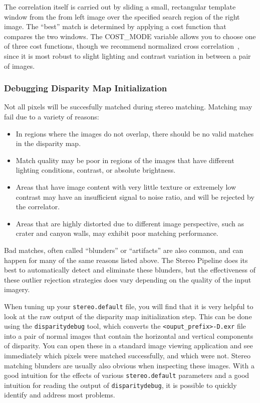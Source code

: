 The correlation itself is carried out by sliding a small, rectangular
template window from the from left image over the specified search
region of the right image.  The ``best'' match is determined by
applying a cost function that compares the two windows.  The
COST\_MODE variable allows you to choose one of three cost functions,
though we recommend normalized cross
correlation~\cite{Menard97:robust}, since it is most robust to slight
lighting and contrast variation in between a pair of images.

\subsubsection{Debugging Disparity Map Initialization}

Not all pixels will be succesfully matched during stereo matching.
Matching may fail due to a variety of reasons:

\begin{itemize}
\item In regions where the images do not overlap, there should be no
  valid matches in the disparity map.
\item Match quality may be poor in regions of the images that have
  different lighting conditions, contrast, or absolute brightness.  
\item Areas that have image content with very little texture or
  extremely low contrast may have an insufficient signal to noise
  ratio, and will be rejected by the correlator.
\item Areas that are highly distorted due to different image
  perspective, such as crater and canyon walls, may exhibit poor
  matching performance.
\end{itemize}

Bad matches, often called ``blunders'' or ``artifacts'' are also
common, and can happen for many of the same reasons listed above.  The
Stereo Pipeline does its best to automatically detect and eliminate
these blunders, but the effectiveness of these outlier rejection
strategies does vary depending on the quality of the input imagery.

When tuning up your {\tt stereo.default} file, you will find that it
is very helpful to look at the raw output of the disparity map
initialization step.  This can be done using the {\tt disparitydebug}
tool, which converts the {\tt <ouput\_prefix>-D.exr} file into a pair
of normal images that contain the horizontal and vertical components
of disparity.  You can open these in a standard image viewing
application and see immediately which pixels were matched
successfully, and which were not.  Stereo matching blunders are
usually also obvious when inspecting these images.  With a good
intuition for the effects of various {\tt stereo.default} parameters
and a good intuition for reading the output of {\tt disparitydebug},
it is possible to quickly identify and address most problems.


